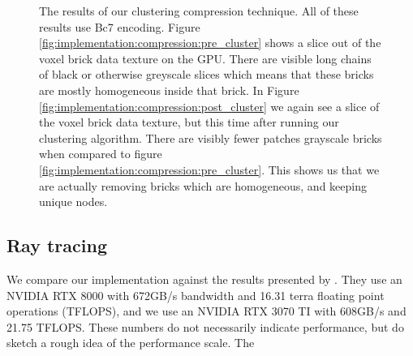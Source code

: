 \begin{figure}[H]
    \centering
    \hfill
    \caption{The results of our clustering compression technique. All of these results use Bc7 encoding. Figure \ref{fig:implementation:compression:pre_cluster} shows a slice out of the voxel brick data texture on the GPU. There are visible long chains of black or otherwise greyscale slices which means that these bricks are mostly homogeneous inside that brick. In Figure \ref{fig:implementation:compression:post_cluster} we again see a slice of the voxel brick data texture, but this time after running our clustering algorithm. There are visibly fewer patches grayscale bricks when compared to figure \ref{fig:implementation:compression:pre_cluster}. This shows us that we are actually removing bricks which are homogeneous, and keeping unique nodes.} \label{fig:implementation:compression:cluster}
\end{figure}

\subsection{Ray tracing} \label{results:ray_tracing}
We compare our implementation against the results presented by \cite{NanoVDBBenchmark}. They use an NVIDIA RTX 8000 with 672GB/s bandwidth and 16.31 terra floating point operations (TFLOPS), and we use an NVIDIA RTX 3070 TI with 608GB/s and 21.75 TFLOPS. These numbers do not necessarily indicate performance, but do sketch a rough idea of the performance scale. The 

